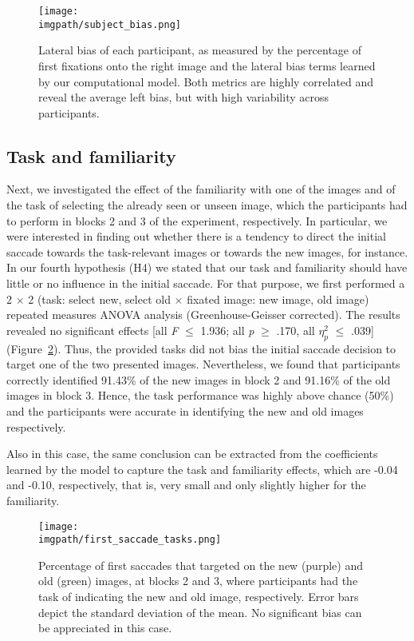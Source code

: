 {\begin{figure}[ht]
  \centering
  \texttt{[image: \\imgpath/subject\_bias.png]}
  \caption{Lateral bias of each participant, as measured by the percentage of first fixations onto the right image and the lateral bias terms learned by our computational model. Both metrics are highly correlated and reveal the average left bias, but with high variability across participants.}
\label{fig:globsal-subject_bias}
\end{figure}

\subsection{Task and familiarity}
\label{sec:results-taskandfam}
Next, we investigated the effect of the familiarity with one of the images and of the task of selecting the already seen or unseen image, which the participants had to perform in blocks 2 and 3 of the experiment, respectively. In particular, we were interested in finding out whether there is a tendency to direct the initial saccade towards the task-relevant images or towards the new images, for instance. In our fourth hypothesis (H4) we stated that our task and familiarity should have little or no influence in the initial saccade. For that purpose, we first performed a 2 $\times$ 2 (task: select new, select old $\times$ fixated image: new image, old image) repeated measures ANOVA analysis (Greenhouse-Geisser corrected). The results revealed no significant effects [all \textit{F} $\leq$ 1.936; all \textit{p} $\geq$ .170, all \textit{$\eta_p^2$} $\leq$ .039] (Figure~\ref{fig:globsal-first_saccade_tasks}). Thus, the provided tasks did not bias the initial saccade decision to target one of the two presented images. Nevertheless, we found that participants correctly identified 91.43\% of the new images in block 2 and 91.16\% of the old images in block 3. Hence, the task performance was highly above chance (50\%) and the participants were accurate in identifying the new and old images respectively.

Also in this case, the same conclusion can be extracted from the coefficients learned by the model to capture the task and familiarity effects, which are -0.04 and -0.10, respectively, that is, very small and only slightly higher for the familiarity.

\begin{figure}[ht]
  \centering
  \texttt{[image: \\imgpath/first\_saccade\_tasks.png]}
  \caption{Percentage of first saccades that targeted on the new (purple) and old (green) images, at blocks 2 and 3, where participants had the task of indicating the new and old image, respectively. Error bars depict the standard deviation of the mean. No significant bias can be appreciated in this case.}
\label{fig:globsal-first_saccade_tasks}
\end{figure}

}
